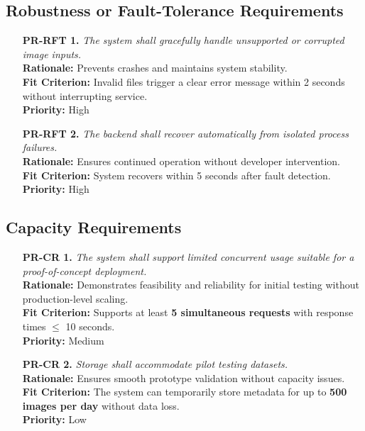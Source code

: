 \documentclass[12pt]{article}
\begin{document}
\subsection{Robustness or Fault-Tolerance Requirements}
\begin{itemize}
    \item[\textbf{PR-RFT 1.}] \textit{The system shall gracefully handle unsupported or corrupted image inputs.}\\
    \textbf{Rationale:} Prevents crashes and maintains system stability.\\
    \textbf{Fit Criterion:} Invalid files trigger a clear error message within 2 seconds without interrupting service.\\
    \textbf{Priority:} High

    \item[\textbf{PR-RFT 2.}] \textit{The backend shall recover automatically from isolated process failures.}\\
    \textbf{Rationale:} Ensures continued operation without developer intervention.\\
    \textbf{Fit Criterion:} System recovers within 5 seconds after fault detection.\\
    \textbf{Priority:} High
\end{itemize}

\subsection{Capacity Requirements}
\begin{itemize}
    \item[\textbf{PR-CR 1.}] \textit{The system shall support limited concurrent usage suitable for a proof-of-concept deployment.}\\
    \textbf{Rationale:} Demonstrates feasibility and reliability for initial testing without production-level scaling.\\
    \textbf{Fit Criterion:} Supports at least \textbf{5 simultaneous requests} with response times $\leq$ 10 seconds.\\
    \textbf{Priority:} Medium

    \item[\textbf{PR-CR 2.}] \textit{Storage shall accommodate pilot testing datasets.}\\
    \textbf{Rationale:} Ensures smooth prototype validation without capacity issues.\\
    \textbf{Fit Criterion:} The system can temporarily store metadata for up to \textbf{500 images per day} without data loss.\\
    \textbf{Priority:} Low
\end{itemize}
\end{document}
